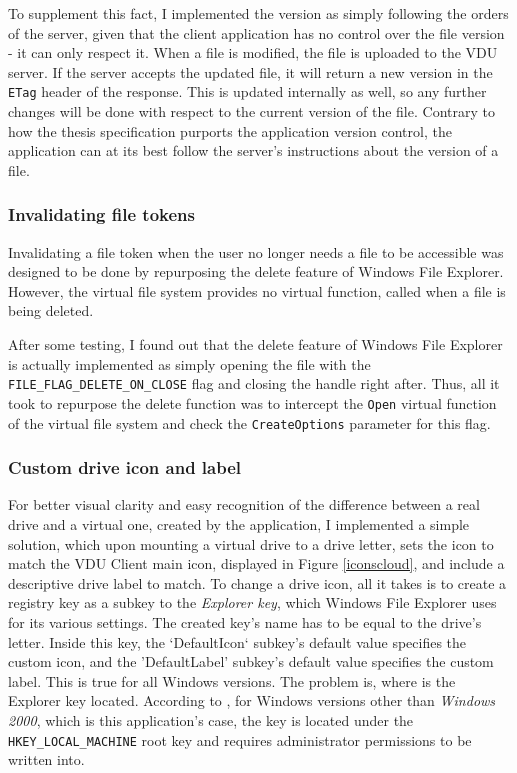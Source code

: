 To supplement this fact, I implemented the version as simply following the orders of the server, given that the client application has no control over the file version - it can only respect it. When a file is modified, the file is uploaded to the VDU server. If the server accepts the updated file, it will return a new version in the \lstinline{ETag} header of the response. This is updated internally as well, so any further changes will be done with respect to the current version of the file. Contrary to how the thesis specification purports the application version control, the application can at its best follow the server's instructions about the version of a file.

\subsubsection{Invalidating file tokens}
Invalidating a file token when the user no longer needs a file to be accessible was designed to be done by repurposing the delete feature of Windows File Explorer. However, the virtual file system provides no virtual function, called when a file is being deleted.

After some testing, I found out that the delete feature of Windows File Explorer is actually implemented as simply opening the file with the \lstinline{FILE_FLAG_DELETE_ON_CLOSE} flag and closing the handle right after. Thus, all it took to repurpose the delete function was to intercept the \lstinline{Open} virtual function of the virtual file system and check the \lstinline{CreateOptions} parameter for this flag.

\subsubsection{Custom drive icon and label}
For better visual clarity and easy recognition of the difference between a real drive and a virtual one, created by the application, I implemented a simple solution, which upon mounting a virtual drive to a drive letter, sets the icon to match the VDU Client main icon, displayed in Figure \ref{iconscloud}, and include a descriptive drive label to match. To change a drive icon, all it takes is to create a registry key as a subkey to the \textit{Explorer key}, which Windows File Explorer uses for its various settings. The created key's name has to be equal to the drive's letter. Inside this key, the `DefaultIcon` subkey's default value specifies the custom icon, and the 'DefaultLabel' subkey's default value specifies the custom label. This is true for all Windows versions. The problem is, where is the Explorer key located. According to \cite{WinDriveIcon}, for Windows versions other than \textit{Windows 2000}, which is this application's case, the key is located under the \lstinline{HKEY_LOCAL_MACHINE} root key and requires administrator permissions to be written into. 

